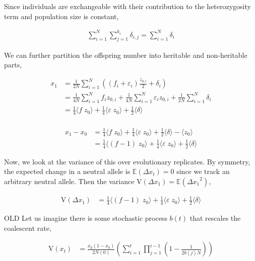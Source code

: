 \documentclass[11pt]{article}
\newcommand{\E}{\mathbb{E}}
\newcommand{\V}{\text{V}}
\begin{document}
Since individuals are exchangeable with their contribution to the
heterozygosity term and population size is constant,

\begin{align}
  \sum_{i=1}^N \sum_{j=1}^{k_i} \delta_{i,j} = \sum_{i=1}^N \delta_{i} 
\end{align}

We can further partition the offspring number into heritable and non-heritable
parts,

\begin{align}
  x_1 &= \frac{1}{2N} \sum_{i=1}^N \left( (f_i + \varepsilon_i) \frac{z_{0,i}}{2} + \delta_{i} \right) \\
      &= \frac{1}{4N} \sum_{i=1}^N f_i z_{0,i} + \frac{1}{4N} \sum_{i=1}^N \varepsilon_i z_{0,i} + \frac{1}{2N} \sum_{i=1}^N \delta_{i} \\
      &=  \frac{1}{4} \langle f \; z_{0} \rangle + \frac{1}{4} \langle \varepsilon \; z_{0} \rangle + \frac{1}{2}\langle \delta \rangle \\
\end{align}


\begin{align}
  x_1 - x_0 &= \frac{1}{4} \langle f \; z_{0} \rangle + \frac{1}{4} \langle \varepsilon \; z_{0} \rangle + \frac{1}{2}\langle \delta \rangle - \langle z_0 \rangle \\
            &= \frac{1}{4} \langle (f-1) \; z_{0} \rangle + \frac{1}{4} \langle \varepsilon \; z_{0} \rangle + \frac{1}{2}\langle \delta \rangle 
\end{align}

Now, we look at the variance of this over evolutionary replicates. By symmetry,
the expected change in a neutral allele is $\E(\Delta x_t) = 0$ since we track
an arbitrary neutral allele. Then the variance $\V(\Delta x_1) = \E( {\Delta
x_1}^2)$,

\begin{align}
  \V(\Delta x_1) &= \frac{1}{4} \langle (f-1) \; z_{0} \rangle + \frac{1}{4} \langle \varepsilon \; z_{0} \rangle + \frac{1}{2}\langle \delta \rangle 
\end{align}


OLD
Let us imagine there is some stochastic process $b(t)$ that rescales the coalescent
rate, 

\begin{align}
  \V(x_t) &= \frac{x_0(1-x_0)}{2N(0)}\left(\sum_{i=1}^t \prod_{j=1}^{i-1} \left(1 - \frac{1}{2b(j)N}\right) \right)
\end{align}
\end{document}

